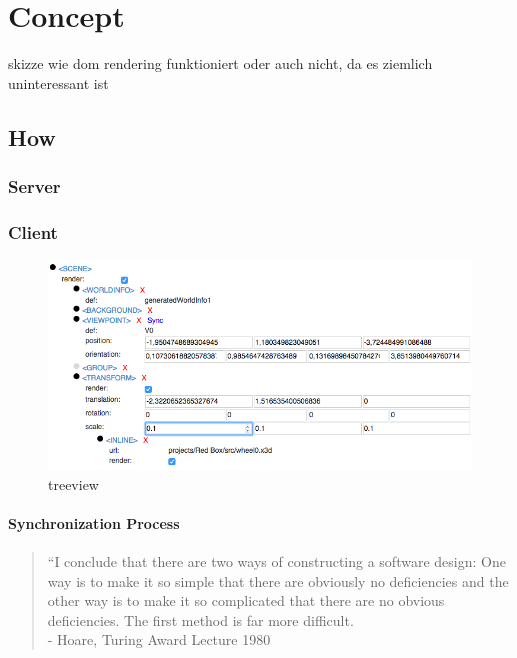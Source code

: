 \section{Concept}\label{concept}

skizze wie dom rendering funktioniert oder auch nicht, da es ziemlich
uninteressant ist

\subsection{How}\label{how}

\subsubsection{Server}\label{server}

\subsubsection{Client}\label{client}

\begin{figure}[htbp]
\centering
\includegraphics{../assets/treeview.png}
\caption{treeview}
\end{figure}

\paragraph{Synchronization Process}\label{synchronization-process}

\begin{quote}
``I conclude that there are two ways of constructing a software design:
One way is to make it so simple that there are obviously no deficiencies
and the other way is to make it so complicated that there are no obvious
deficiencies. The first method is far more difficult.\\
- Hoare, Turing Award Lecture 1980
\end{quote}

